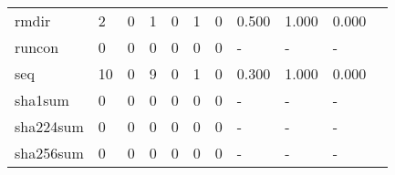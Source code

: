 \begin{longtable}{lp{1.2cm}p{1.2cm}p{1.2cm}p{1.2cm}p{1.2cm}p{1.2cm}p{1.2cm}p{1.2cm}p{1.2cm}p{1.2cm}}
rmdir     &                                     2 &                                                  0 &                                                  1 &                                                  0 &                                                  1 &                                                  0 &                                              0.500 &                                              1.000 &                                              0.000 \\
runcon    &                                     0 &                                                  0 &                                                  0 &                                                  0 &                                                  0 &                                                  0 &                                                  - &                                                  - &                                                  - \\
seq       &                                    10 &                                                  0 &                                                  9 &                                                  0 &                                                  1 &                                                  0 &                                              0.300 &                                              1.000 &                                              0.000 \\
sha1sum   &                                     0 &                                                  0 &                                                  0 &                                                  0 &                                                  0 &                                                  0 &                                                  - &                                                  - &                                                  - \\
sha224sum &                                     0 &                                                  0 &                                                  0 &                                                  0 &                                                  0 &                                                  0 &                                                  - &                                                  - &                                                  - \\
sha256sum &                                     0 &                                                  0 &                                                  0 &                                                  0 &                                                  0 &                                                  0 &                                                  - &                                                  - &                                                  - \\

\end{longtable}

